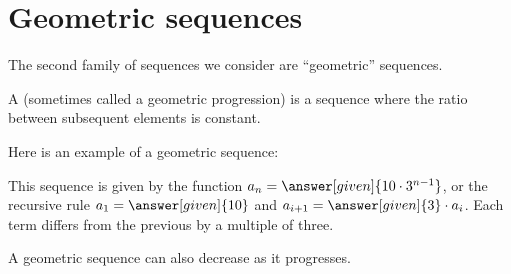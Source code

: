 \documentclass{ximera}
\begin{document}


\section{Geometric sequences}


The second family of sequences we consider are ``geometric''
sequences.

\begin{definition}
  A  (sometimes called a geometric
  progression) is a sequence where the
  ratio between subsequent elements is constant.
\end{definition}

\begin{example}
  Here is an example of a geometric sequence:
  \begin{image}
  \end{image}
  This sequence is given by the function $a_n=\answer[given]{10\cdot
    3^{n-1}}$, or the recursive rule $a_1 = \answer[given]{10}$ and
  $a_{i+1} = \answer[given]{3}\cdot a_i$. Each term differs from the
  previous by a multiple of three.
\end{example}

A geometric sequence can also decrease as it progresses.
\end{document}
